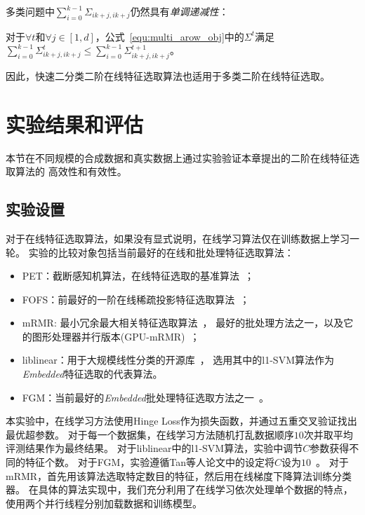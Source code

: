 \documentclass[doctor]{ustcthesis}
\begin{document}
多类问题中$\sum_{i=0}^{k-1}\Sigma_{ik+j,ik+j}$仍然具有\emph{单调递减性}：
\begin{proposition}[单调递减性]
    对于$\forall t$和$\forall j \in [1,d]$，公式~\eqref{equ:multi_arow_obj}中的$\Sigma^t$满足
    $\sum_{i=0}^{k-1}\Sigma^{t}_{ik+j,ik+j} \leq \sum_{i=0}^{k-1}\Sigma^{t+1}_{ik+j,ik+j}$。
\end{proposition}
因此，快速二分类二阶在线特征选取算法也适用于多类二阶在线特征选取。

\section{实验结果和评估}
本节在不同规模的合成数据和真实数据上通过实验验证本章提出的二阶在线特征选取算法的
高效性和有效性。

\subsection{实验设置}
对于在线特征选取算法，如果没有显式说明，在线学习算法仅在训练数据上学习一轮。
实验的比较对象包括当前最好的在线和批处理特征选取算法：
\vspace{-0.3em}
\begin{itemize}\setlength{\itemsep}{-0.5em}
    \item PET：截断感知机算法，在线特征选取的基准算法~\cite{wang2014online}；
    \item FOFS：前最好的一阶在线稀疏投影特征选取算法~\cite{wang2014online}；
    \item mRMR: 最小冗余最大相关特征选取算法~\cite{peng2005feature}，
        最好的批处理方法之一，以及它的图形处理器并行版本(GPU-mRMR)~\cite{ramirez2016fast}；
    \item liblinear：用于大规模线性分类的开源库~\cite{fan2008liblinear}，
        选用其中的l1-SVM算法作为\emph{Embedded}特征选取的代表算法。 \item
        FGM：当前最好的\emph{Embedded}批处理特征选取方法之一~\cite{tantw14fgm}。
\end{itemize}

本实验中，在线学习方法使用Hinge Loss作为损失函数，并通过五重交叉验证找出最优超参数。
对于每一个数据集，在线学习方法随机打乱数据顺序$10$次并取平均评测结果作为最终结果。
对于liblinear中的l1-SVM算法，实验中调节$C$参数获得不同的特征个数。
对于FGM，实验遵循Tan等人论文中的设定将$C$设为$10$~\cite{tantw14fgm}。
对于mRMR，首先用该算法选取特定数目的特征，然后用在线梯度下降算法训练分类器。
在具体的算法实现中，我们充分利用了在线学习依次处理单个数据的特点，
使用两个并行线程分别加载数据和训练模型。
\end{document}
